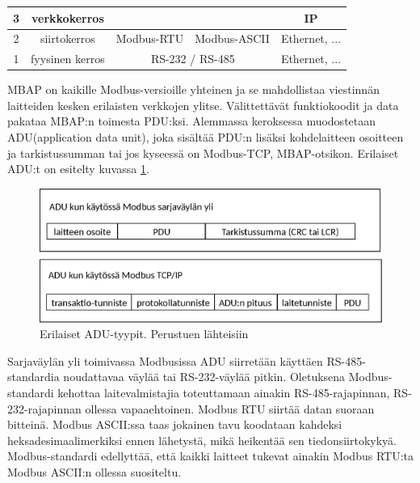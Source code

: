 \begin{table}
\begin{tabular}{|c|c|ccc}
      3                                         & verkkokerros                     &                                                         & \multicolumn{1}{c|}{}                                     & \multicolumn{1}{c|}{IP}                                       \\ \hline
      2                                         & siirtokerros                     & \multicolumn{1}{c|}{\cellcolor[HTML]{6F6FE6}Modbus-RTU} & \multicolumn{1}{c|}{\cellcolor[HTML]{6F6FE6}Modbus-ASCII} & \multicolumn{1}{c|}{Ethernet, ...}                            \\ \hline
      1                                         & fyysinen kerros                  & \multicolumn{2}{c|}{RS-232 / RS-485}                                                                                & \multicolumn{1}{c|}{Ethernet, ...}                            \\ \hline
      \end{tabular}
      \label{rakenne}
    \end{table}

    \gls{MBAP} on kaikille Modbus-versioille yhteinen ja se mahdollistaa viestinnän laitteiden kesken erilaisten verkkojen ylitse. Välittettävät funktiokoodit ja data pakataa \gls{MBAP}:n toimesta PDU:ksi. Alemmassa keroksessa muodostetaan \gls{ADU}(application data unit), joka sisältää PDU:n lisäksi kohdelaitteen osoitteen ja tarkistussumman tai jos kyseessä on Modbus-TCP, \gls{MBAP}-otsikon. Erilaiset ADU:t on esitelty kuvassa \ref{fig:adu}.
    \begin{figure}[h]
      \centering
      \includegraphics[width=1\textwidth]{figures/adu}
      \caption[ADU-tyypit]{Erilaiset ADU-tyypit.  Perustuen lähteisiin \parencite{modbusTCPIPSpec, modbusSerialSpec}}
      \label{fig:adu}
    \end{figure}

    Sarjaväylän yli toimivassa Modbusissa ADU siirretään käyttäen RS-485-standardia noudattavaa väylää tai RS-232-väylää pitkin. Oletuksena Modbus-standardi kehottaa laitevalmistajia toteuttamaan ainakin RS-485-rajapinnan, RS-232-rajapinnan ollessa vapaaehtoinen. Modbus \gls{RTU} siirtää datan suoraan bitteinä. Modbus \gls{ASCII}:ssa taas jokainen tavu koodataan kahdeksi heksadesimaalimerkiksi ennen lähetystä, mikä heikentää sen tiedonsiirtokykyä. Modbus-standardi edellyttää, että kaikki laitteet tukevat ainakin Modbus RTU:ta Modbus ASCII:n ollessa suositeltu. \parencite{modbusSerialSpec}

